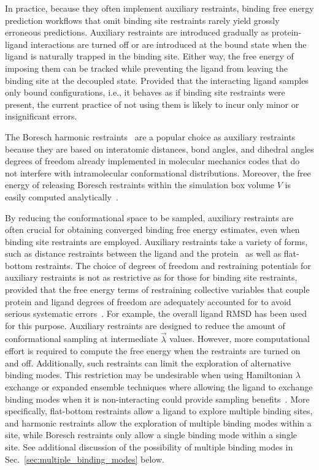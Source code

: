 \documentclass[9pt,bestpractices]{livecoms}
\begin{document}
In practice, because they often implement auxiliary restraints, binding free energy prediction workflows that omit binding site restraints rarely yield grossly erroneous predictions. Auxiliary restraints are introduced gradually as protein-ligand interactions are turned off or are introduced at the bound state when the ligand is naturally trapped in the binding site. Either way, the free energy of imposing them can be tracked while preventing the ligand from leaving the binding site at the decoupled state. Provided that the interacting ligand samples only bound configurations, i.e., it behaves as if binding site restraints were present, the current practice of not using them is likely to incur only minor or insignificant errors. 

The Boresch harmonic restraints~\cite{boresch2003absolute,baumann2023broadening} are a popular choice as auxiliary restraints because they are based on interatomic distances, bond angles, and dihedral angles degrees of freedom already implemented in molecular mechanics codes that do not interfere with intramolecular conformational distributions. Moreover, the free energy of releasing Boresch restraints within the simulation box volume $V$ is easily computed analytically~\cite{boresch2003absolute, boresch2024analytical}.

By reducing the conformational space to be sampled, auxiliary restraints are often crucial for obtaining converged binding free energy estimates, even when binding site restraints are employed.
Auxiliary restraints take a variety of forms, such as distance restraints between the ligand and the protein~\cite{mobley2006use,clark2023comparison} as well as flat-bottom restraints. The choice of degrees of freedom and restraining potentials for auxiliary restraints is not as restrictive as for those for binding site restraints, provided that the free energy terms of restraining collective variables that couple protein and ligand degrees of freedom are adequately accounted for to avoid serious systematic errors~\cite{clark2023comparison}.
For example, the overall ligand RMSD has been used~\cite{woo2005calculation} for this purpose. Auxiliary restraints are designed to reduce the amount of conformational sampling at intermediate $\vec{\lambda}$ values. However, more computational effort is required to compute the free energy when the restraints are turned on and off. Additionally, such restraints can limit the exploration of alternative binding modes. This restriction may be undesirable when using Hamiltonian $\lambda$ exchange or expanded ensemble techniques where allowing the ligand to exchange binding modes when it is non-interacting could provide sampling benefits~\cite{wang2013identifying}.
More specifically, flat-bottom restraints allow a ligand to explore multiple binding sites, and harmonic restraints allow the exploration of multiple binding modes within a site, while Boresch restraints only allow a single binding mode within a single site.
See additional discussion of the possibility of multiple binding modes in Sec.~\ref{sec:multiple_binding_modes} below.
\end{document}
